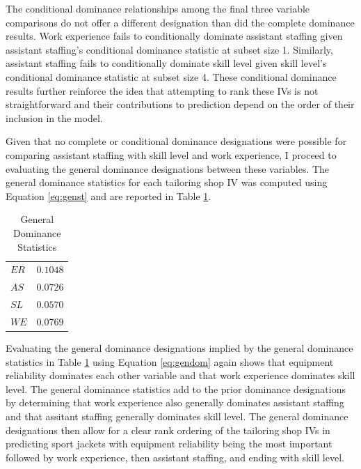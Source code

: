 \documentclass[ShortAfour,times,sageapa]{sagej}
\begin{document}
	The conditional dominance relationships among the final three variable comparisons do not offer a different designation than did the complete dominance results.
	Work experience fails to conditionally dominate assistant staffing given assistant staffing's conditional dominance statistic at subset size 1. 
	Similarly, assistant staffing fails to conditionally dominate skill level given skill level's conditional dominance statistic at subset size 4.
	These conditional dominance results further reinforce the idea that attempting to rank these IVs is not straightforward and their contributions to prediction depend on the order of their inclusion in the model. 
	
	Given that no complete or conditional dominance designations were possible for comparing assistant staffing with skill level and work experience, I proceed to evaluating the general dominance designations between these variables. 
	The general dominance statistics for each tailoring shop IV was computed using Equation \ref{eq:genst} and are reported in Table \ref{tab:gen}.
	
	\begin{table}[h!]
		\centering
		\caption{\centering General Dominance Statistics}
		\begin{tabular}{l|r}
			\toprule
			$ER$ & $0.1048$ \\ 
			$AS$ & $0.0726$ \\ 
			$SL$ & $0.0570$ \\ 
			$WE$ & $0.0769$ \\ 
			\bottomrule
		\end{tabular}
		\label{tab:gen}
	\end{table}

	Evaluating the general dominance designations implied by the general dominance statistics in Table \ref{tab:gen} using Equation \ref{eq:gendom} again shows that equipment reliability dominates each other variable and that work experience dominates skill level. 
	The general dominance statistics add to the prior dominance designations by determining that work experience also generally dominates assistant staffing and that assitant staffing generally dominates skill level.
	The general dominance designations then allow for a clear rank ordering of the tailoring shop IVs in predicting sport jackets with equipment reliability being the most important followed by work experience, then assistant staffing, and ending with skill level.
	
\end{document}
